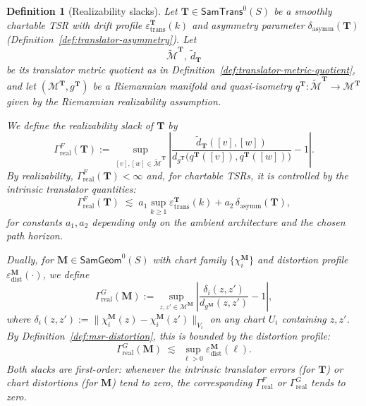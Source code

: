 \documentclass[11pt]{article}
\newtheorem{definition}{Definition}
\newcommand{\SamTrans}{\mathsf{SamTrans}}
\newcommand{\SamGeom}{\mathsf{SamGeom}}
\begin{document}
\begin{definition}[Realizability slacks]
\label{def:realizability-slacks}
Let $\mathbf{T} \in \SamTrans^0(S)$ be a smoothly chartable TSR with drift
profile $\varepsilon_{\mathrm{trans}}^{\mathbf{T}}(k)$ and asymmetry parameter
$\delta_{\mathrm{asymm}}(\mathbf{T})$ (Definition~\ref{def:translator-asymmetry}).
Let
\[
\tilde{\mathcal{M}}^{\mathbf{T}},\ \tilde d_{\mathbf{T}}
\]
be its translator metric quotient as in
Definition~\ref{def:translator-metric-quotient}, and
let $(\mathcal{M}^{\mathbf{T}}, g^{\mathbf{T}})$ be a Riemannian manifold
and quasi-isometry $q^{\mathbf{T}} : \tilde{\mathcal{M}}^{\mathbf{T}} \to
\mathcal{M}^{\mathbf{T}}$ given by the Riemannian realizability assumption.

We define the \emph{realizability slack} of $\mathbf{T}$ by
\begin{equation}
\label{eq:gamma-real-F}
\Gamma_{\mathrm{real}}^{F}(\mathbf{T})
:= \sup_{[v],[w] \in \tilde{\mathcal{M}}^{\mathbf{T}}}
\left|
\frac{\tilde d_{\mathbf{T}}([v],[w])}{d_{g^{\mathbf{T}}}
\bigl(q^{\mathbf{T}}([v]), q^{\mathbf{T}}([w])\bigr)} - 1
\right|.
\end{equation}
By realizability, $\Gamma_{\mathrm{real}}^{F}(\mathbf{T}) < \infty$ and,
for chartable TSRs, it is controlled by the intrinsic translator
quantities:
\[
\Gamma_{\mathrm{real}}^{F}(\mathbf{T})
\;\lesssim\;
a_1 \sup_{k \ge 1} \varepsilon_{\mathrm{trans}}^{\mathbf{T}}(k)
+ a_2\, \delta_{\mathrm{asymm}}(\mathbf{T}),
\]
for constants $a_1,a_2$ depending only on the ambient architecture and
the chosen path horizon.

Dually, for $\mathbf{M} \in \SamGeom^0(S)$ with chart family
$\{\chi_i^{\mathbf{M}}\}$ and distortion profile
$\varepsilon_{\mathrm{dist}}^{\mathbf{M}}(\cdot)$, we define
\begin{equation}
\label{eq:gamma-real-G}
\Gamma_{\mathrm{real}}^{G}(\mathbf{M})
:= \sup_{z,z' \in \mathcal{M}^{\mathbf{M}}}
\left|
\frac{\delta_i(z,z')}{d_{g^{\mathbf{M}}}(z,z')} - 1
\right|,
\end{equation}
where $\delta_i(z,z') := \|\chi_i^{\mathbf{M}}(z) -
\chi_i^{\mathbf{M}}(z')\|_{V_i}$ on any chart $U_i$ containing $z,z'$.
By Definition~\ref{def:msr-distortion}, this is bounded by the
distortion profile:
\[
\Gamma_{\mathrm{real}}^{G}(\mathbf{M})
\;\lesssim\;
\sup_{\ell > 0} \varepsilon_{\mathrm{dist}}^{\mathbf{M}}(\ell).
\]
Both slacks are \emph{first-order}: whenever the intrinsic translator
errors (for $\mathbf{T}$) or chart distortions (for $\mathbf{M}$) tend
to zero, the corresponding $\Gamma_{\mathrm{real}}^{F}$ or
$\Gamma_{\mathrm{real}}^{G}$ tends to zero.
\end{definition}
\end{document}
